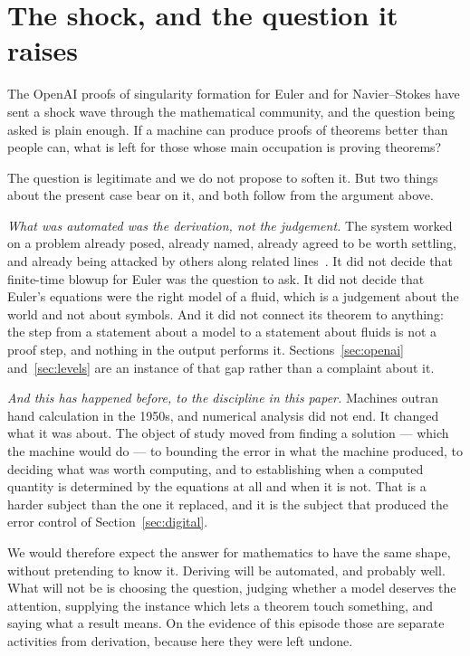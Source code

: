 \documentclass[11pt]{article}
\begin{document}
\section{The shock, and the question it raises}\label{sec:shock}

The OpenAI proofs of singularity formation for Euler and for Navier--Stokes have sent a shock wave
through the mathematical community, and the question being asked is plain enough. If a machine can
produce proofs of theorems better than people can, what is left for those whose main occupation is
proving theorems?

The question is legitimate and we do not propose to soften it. But two things about the present case
bear on it, and both follow from the argument above.

\emph{What was automated was the derivation, not the judgement.} The system worked on a problem
already posed, already named, already agreed to be worth settling, and already being attacked by
others along related lines~\cite{buckmaster}. It did not decide that finite-time blowup for Euler
was the question to ask. It did not decide that Euler's equations were the right model of a fluid,
which is a judgement about the world and not about symbols. And it did not connect its theorem to
anything: the step from a statement about a model to a statement about fluids is not a proof step,
and nothing in the output performs it. Sections~\ref{sec:openai} and~\ref{sec:levels} are an
instance of that gap rather than a complaint about it.

\emph{And this has happened before, to the discipline in this paper.} Machines outran hand
calculation in the 1950s, and numerical analysis did not end. It changed what it was about. The
object of study moved from finding a solution --- which the machine would do --- to bounding the
error in what the machine produced, to deciding what was worth computing, and to establishing when a
computed quantity is determined by the equations at all and when it is not. That is a harder subject
than the one it replaced, and it is the subject that produced the error control of
Section~\ref{sec:digital}.

We would therefore expect the answer for mathematics to have the same shape, without pretending to
know it. Deriving will be automated, and probably well. What will not be is choosing the question,
judging whether a model deserves the attention, supplying the instance which lets a theorem touch
something, and saying what a result means. On the evidence of this episode those are separate
activities from derivation, because here they were left undone.
\end{document}
